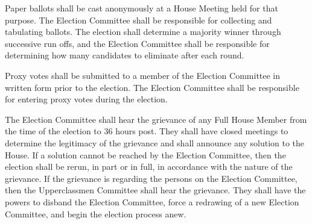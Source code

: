 \documentclass[10pt]{article} %
\begin{document}
Paper ballots shall be cast anonymously at a House Meeting held for that purpose. The Election Committee shall be responsible for collecting and tabulating ballots. The election shall determine a majority winner through successive run offs, and the Election Committee shall be responsible for determining how many candidates to eliminate after each round.

Proxy votes shall be submitted to a member of the Election Committee in written form prior to the election. The Election Committee shall be responsible for entering proxy votes during the election.

The Election Committee shall hear the grievance of any Full House Member from the time of the election to 36 hours post. They shall have closed meetings to determine the legitimacy of the grievance and shall announce any solution to the House. If a solution cannot be reached by the Election Committee, then the election shall be rerun, in part or in full, in accordance with the nature of the grievance. If the grievance is regarding the persons on the Election Committee, then the Upperclassmen Committee shall hear the grievance. They shall have the powers to disband the Election Committee, force a redrawing of a new Election Committee, and begin the election process anew.
\end{document}
